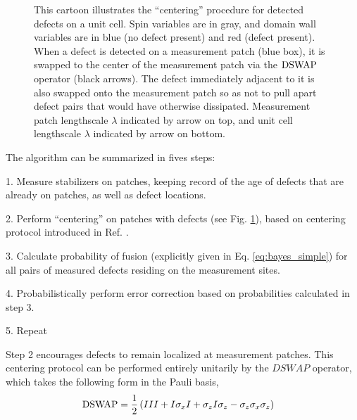 \documentclass[twocolumn,superscriptaddress,aps,prb,floatfix]{revtex4-1}
\newcommand{\figref}[1]{Fig. \ref{#1}}
\begin{document}
\begin{figure}
\begin{center}
\end{center}
\caption{This cartoon illustrates the ``centering'' procedure for detected defects on a unit cell.  Spin variables are in gray, and domain wall variables are in blue (no defect present) and red (defect present).  When a defect is detected on a measurement patch (blue box), it is swapped to the center of the measurement patch via the $\rm{DSWAP}$ operator (black arrows).  The defect immediately adjacent to it is also swapped onto the measurement patch so as not to pull apart defect pairs that would have otherwise dissipated.  Measurement patch lengthscale $\lambda$ indicated by arrow on top, and unit cell lengthscale $\lambda$ indicated by arrow on bottom.}
\label{fig:detect_swap}
\end{figure}

The algorithm can be summarized in fives steps:

1. Measure stabilizers on patches, keeping record of the age of defects that are already on patches, as well as defect locations.  

2. Perform ``centering'' on patches with defects (see \figref{fig:detect_swap}), based on centering protocol introduced in Ref. \cite{Freeman2016}.

3. Calculate probability of fusion (explicitly given in Eq. \ref{eq:bayes_simple}) for all pairs of measured defects residing on the measurement sites.

4. Probabilistically perform error correction based on probabilities calculated in step 3.

5. Repeat

Step 2 encourages defects to remain localized at measurement patches.  This centering protocol can be performed entirely unitarily by the $DSWAP$ operator, which takes the following form in the Pauli basis,
\begin{align}
\rm{DSWAP} &= \frac{1}{2} \left(III + I\sigma_x I + \sigma_z I \sigma_z - \sigma_z \sigma_x \sigma_z \right)
\end{align}
\end{document}
